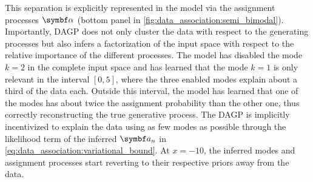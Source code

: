 This separation is explicitly represented in the model via the assignment processes $\mat{\alpha}$ (bottom panel in \cref{fig:data_association:semi_bimodal}).
Importantly, DAGP does not only cluster the data with respect to the generating processes but also infers a factorization of the input space with respect to the relative importance of the different processes.
The model has disabled the mode $k = 2$ in the complete input space and has learned that the mode $k = 1$ is only relevant in the interval $[0, 5]$, where the three enabled modes explain about a third of the data each.
Outside this interval, the model has learned that one of the modes has about twice the assignment probability than the other one, thus correctly reconstructing the true generative process.
The DAGP is implicitly incentivized to explain the data using as few modes as possible through the likelihood term of the inferred $\mat{a}_n$ in \cref{eq:data_association:variational_bound}.
At $x = -10$, the inferred modes and assignment processes start reverting to their respective priors away from the data.



